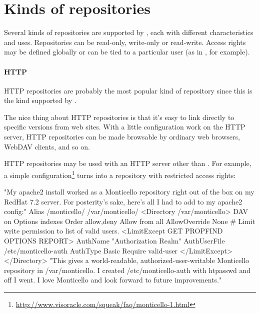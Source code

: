 \documentclass[a4paper,10pt,twoside]{book}
\begin{document}

\section{Kinds of repositories}

Several kinds of repositories are supported by \MC, each with different characteristics and uses. Repositories can be read-only, write-only or read-write. Access rights may be defined globally or can be tied to a particular user (as in \sqsrc, for example).

\paragraph{HTTP} HTTP repositories are probably the most popular kind of repository since this is the kind supported by \sqsrc. %

The nice thing about HTTP repositories is that it's easy to link directly to specific versions from web sites. With a little configuration work on the HTTP server, HTTP repositories can be made browsable by ordinary web browsers, WebDAV clients, and so on.

HTTP repositories may be used with an HTTP server other than \ind{\sqsrc}. For example, a simple configuration\footnote{\url{http://www.visoracle.com/squeak/faq/monticello-1.html}} turns  into a \MC repository with restricted access rights:

\begin{code}{}
"My apache2 install worked as a Monticello repository right out of the box on my
RedHat 7.2 server.  For posterity's sake, here's all I had to add to my apache2 config:"
Alias /monticello/ /var/monticello/
<Directory /var/monticello>
  DAV on
  Options indexes
  Order allow,deny
  Allow from all
  AllowOverride None
  # Limit write permission to list of valid users.
  <LimitExcept GET PROPFIND OPTIONS REPORT>
    AuthName "Authorization Realm"
    AuthUserFile /etc/monticello-auth
    AuthType Basic
    Require valid-user
  </LimitExcept>
</Directory>
"This gives a world-readable, authorized-user-writable Monticello repository in
/var/monticello.  I created /etc/monticello-auth with htpasswd and off I went.
I love Monticello and look forward to future improvements."
\end{code}
\end{document}
